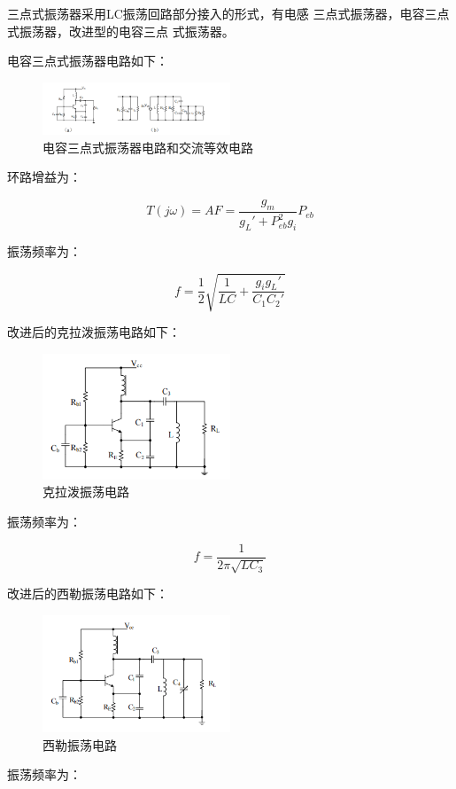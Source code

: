 \documentclass{../source/Experiment}
\begin{document}
        三点式振荡器采用LC振荡回路部分接入的形式，有电感
        三点式振荡器，电容三点式振荡器，改进型的电容三点
        式振荡器。

        电容三点式振荡器电路如下：
        \begin{figure}[H]
            \centering
            \includegraphics[width = 0.5\textwidth]{lab3/3.png}
            \caption{电容三点式振荡器电路和交流等效电路}    
        \end{figure}
        环路增益为：

        $$
        T(j\omega) = AF = \frac{g_m}{g_L' + P_{eb}^2g_i}P_{eb}
        $$

        振荡频率为：

        $$
        f = \frac{1}{2}\sqrt{\frac{1}{LC} + \frac{g_ig_L'}{C_1C_2'}}
        $$

        改进后的克拉泼振荡电路如下：
        \begin{figure}[H]
            \centering
            \includegraphics[width = 0.5\textwidth]{lab3/4.png}
            \caption{克拉泼振荡电路}    
        \end{figure}
        振荡频率为：

        $$
        f = \frac{1}{2\pi\sqrt{LC_3}}
        $$

        改进后的西勒振荡电路如下：
        \begin{figure}[H]
            \centering
            \includegraphics[width = 0.5\textwidth]{lab3/5.png}
            \caption{西勒振荡电路}    
        \end{figure}
        振荡频率为：
\end{document}
